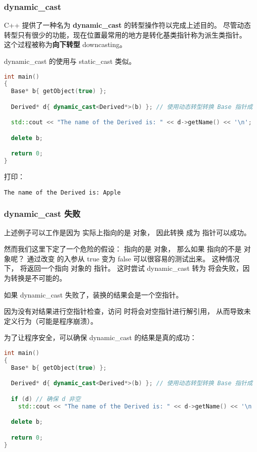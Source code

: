 \documentclass[../../LearnCpp.tex]{subfiles}
\begin{document}
\subsubsection*{dynamic\_cast}

C++ 提供了一种名为 \textbf{dynamic\_cast} 的转型操作符以完成上述目的。
尽管动态转型只有很少的功能，现在位置最常用的地方是转化基类指针称为派生类指针。
这个过程被称为\textbf{向下转型} downcasting。

dynamic\_cast 的使用与 static\_cast 类似。

\begin{lstlisting}[language=C++]
int main()
{
  Base* b{ getObject(true) };

  Derived* d{ dynamic_cast<Derived*>(b) }; // 使用动态转型转换 Base 指针成为 Derived 指针

  std::cout << "The name of the Derived is: " << d->getName() << '\n';

  delete b;

  return 0;
}
\end{lstlisting}

打印：

\begin{lstlisting}
The name of the Derived is: Apple
\end{lstlisting}

\subsubsection*{dynamic\_cast 失败}

上述例子可以工作是因为  实际上指向的是  对象，
因此转换  成为  指针可以成功。

然而我们这里下定了一个危险的假设： 指向的是  对象，
那么如果  指向的不是  对象呢？
通过改变  的入参从 true 变为 false 可以很容易的测试出来。
这种情况下， 将返回一个指向  对象的  指针。
这时尝试 dynamic\_cast 转为  将会失败，因为转换是不可能的。

如果 dynamic\_cast 失败了，装换的结果会是一个空指针。

因为没有对结果进行空指针检查，访问  时将会对空指针进行解引用，
从而导致未定义行为（可能是程序崩溃）。

为了让程序安全，可以确保 dynamic\_cast 的结果是真的成功：

\begin{lstlisting}[language=C++]
int main()
{
  Base* b{ getObject(true) };

  Derived* d{ dynamic_cast<Derived*>(b) }; // 使用动态转型转换 Base 指针成为 Derived 指针

  if (d) // 确保 d 非空
    std::cout << "The name of the Derived is: " << d->getName() << '\n';

  delete b;

  return 0;
}
\end{lstlisting}
\end{document}

